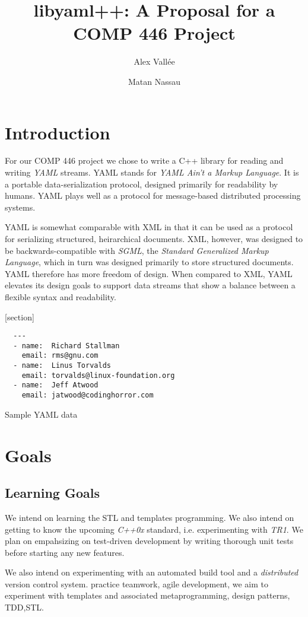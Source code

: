 \documentclass{article}
\author{Alex Vall\'ee \and Matan Nassau}
\title{libyaml++:  A Proposal for a COMP 446 Project}
\begin{document}
\maketitle

\section{Introduction}
For our COMP 446 project we chose to write a C++ library for reading and writing \emph{YAML} streams.  YAML stands for \emph{YAML Ain't a Markup Language}.  It is a portable data-serialization protocol, designed primarily for readability by humans.  YAML plays well as a protocol for message-based distributed processing systems.

YAML is somewhat comparable with XML in that it can be used as a protocol for serializing structured, heirarchical documents.  XML, however, was designed to be backwards-compatible with \emph{SGML}, the \emph{Standard Generalized Markup Language}, which in turn was designed primarily to store structured documents.  YAML therefore has more freedom of design.  When compared to XML, YAML elevates its design goals to support data streams that show a balance between a flexible syntax and readability.

[section]
\begin{Figure}
  \begin{verbatim}
  ---
  - name:  Richard Stallman
    email: rms@gnu.com
  - name:  Linus Torvalds
    email: torvalds@linux-foundation.org
  - name:  Jeff Atwood
    email: jatwood@codinghorror.com
  \end{verbatim}
  \caption{Sample YAML data}
\end{Figure}

\section{Goals}

\subsection{Learning Goals}
We intend on learning the STL and templates programming. We also intend on getting to know the upcoming \emph{C++0x} standard, i.e. experimenting with \emph{TR1}.  We plan on empahsizing on test-driven development by writing thorough unit tests before starting any new features.

We also intend on experimenting with an automated build tool and a \emph{distributed} version control system.  practice teamwork, agile development, we aim to experiment with templates and associated metaprogramming, design patterns, TDD,STL.
\end{document}
